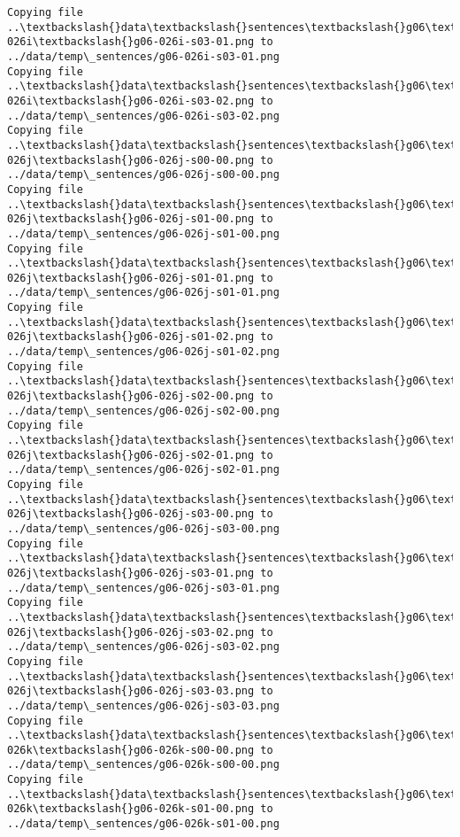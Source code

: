 \documentclass[11pt]{article}
\begin{document}
\begin{Verbatim}[commandchars=\\\{\}]
Copying file ..\textbackslash{}data\textbackslash{}sentences\textbackslash{}g06\textbackslash{}g06-026i\textbackslash{}g06-026i-s03-01.png to
../data/temp\_sentences/g06-026i-s03-01.png
Copying file ..\textbackslash{}data\textbackslash{}sentences\textbackslash{}g06\textbackslash{}g06-026i\textbackslash{}g06-026i-s03-02.png to
../data/temp\_sentences/g06-026i-s03-02.png
Copying file ..\textbackslash{}data\textbackslash{}sentences\textbackslash{}g06\textbackslash{}g06-026j\textbackslash{}g06-026j-s00-00.png to
../data/temp\_sentences/g06-026j-s00-00.png
Copying file ..\textbackslash{}data\textbackslash{}sentences\textbackslash{}g06\textbackslash{}g06-026j\textbackslash{}g06-026j-s01-00.png to
../data/temp\_sentences/g06-026j-s01-00.png
Copying file ..\textbackslash{}data\textbackslash{}sentences\textbackslash{}g06\textbackslash{}g06-026j\textbackslash{}g06-026j-s01-01.png to
../data/temp\_sentences/g06-026j-s01-01.png
Copying file ..\textbackslash{}data\textbackslash{}sentences\textbackslash{}g06\textbackslash{}g06-026j\textbackslash{}g06-026j-s01-02.png to
../data/temp\_sentences/g06-026j-s01-02.png
Copying file ..\textbackslash{}data\textbackslash{}sentences\textbackslash{}g06\textbackslash{}g06-026j\textbackslash{}g06-026j-s02-00.png to
../data/temp\_sentences/g06-026j-s02-00.png
Copying file ..\textbackslash{}data\textbackslash{}sentences\textbackslash{}g06\textbackslash{}g06-026j\textbackslash{}g06-026j-s02-01.png to
../data/temp\_sentences/g06-026j-s02-01.png
Copying file ..\textbackslash{}data\textbackslash{}sentences\textbackslash{}g06\textbackslash{}g06-026j\textbackslash{}g06-026j-s03-00.png to
../data/temp\_sentences/g06-026j-s03-00.png
Copying file ..\textbackslash{}data\textbackslash{}sentences\textbackslash{}g06\textbackslash{}g06-026j\textbackslash{}g06-026j-s03-01.png to
../data/temp\_sentences/g06-026j-s03-01.png
Copying file ..\textbackslash{}data\textbackslash{}sentences\textbackslash{}g06\textbackslash{}g06-026j\textbackslash{}g06-026j-s03-02.png to
../data/temp\_sentences/g06-026j-s03-02.png
Copying file ..\textbackslash{}data\textbackslash{}sentences\textbackslash{}g06\textbackslash{}g06-026j\textbackslash{}g06-026j-s03-03.png to
../data/temp\_sentences/g06-026j-s03-03.png
Copying file ..\textbackslash{}data\textbackslash{}sentences\textbackslash{}g06\textbackslash{}g06-026k\textbackslash{}g06-026k-s00-00.png to
../data/temp\_sentences/g06-026k-s00-00.png
Copying file ..\textbackslash{}data\textbackslash{}sentences\textbackslash{}g06\textbackslash{}g06-026k\textbackslash{}g06-026k-s01-00.png to
../data/temp\_sentences/g06-026k-s01-00.png

\end{Verbatim}
\end{document}
